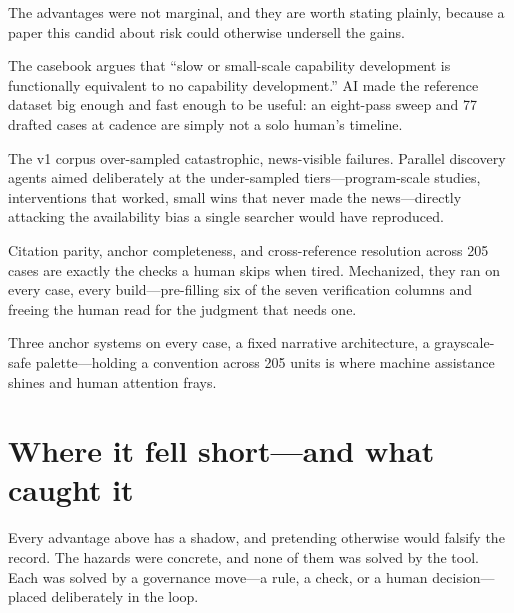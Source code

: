 \documentclass[11pt]{article}
\begin{document}
The advantages were not marginal, and they are worth stating plainly, because a paper this candid about risk could otherwise undersell the gains.

\begin{description}[leftmargin=1.1em,itemsep=4pt,topsep=3pt,font=\color{lensgood}\bfseries]
  \item[Speed and scale, together.] The casebook argues that ``slow or small-scale capability development is functionally equivalent to no capability development.'' AI made the reference dataset big enough and fast enough to be useful: an eight-pass sweep and 77 drafted cases at cadence are simply not a solo human's timeline.
  \item[Breadth that fights a known bias.] The v1 corpus over-sampled catastrophic, news-visible failures. Parallel discovery agents aimed deliberately at the under-sampled tiers---program-scale studies, interventions that worked, small wins that never made the news---directly attacking the availability bias a single searcher would have reproduced.
  \item[Tireless mechanical rigor.] Citation parity, anchor completeness, and cross-reference resolution across 205 cases are exactly the checks a human skips when tired. Mechanized, they ran on every case, every build---pre-filling six of the seven verification columns and freeing the human read for the judgment that needs one.
  \item[Structural consistency.] Three anchor systems on every case, a fixed narrative architecture, a grayscale-safe palette---holding a convention across 205 units is where machine assistance shines and human attention frays.
\end{description}

\section{Where it fell short---and what caught it}

Every advantage above has a shadow, and pretending otherwise would falsify the record. The hazards were concrete, and none of them was solved by the tool. Each was solved by a governance move---a rule, a check, or a human decision---placed deliberately in the loop.
\end{document}
